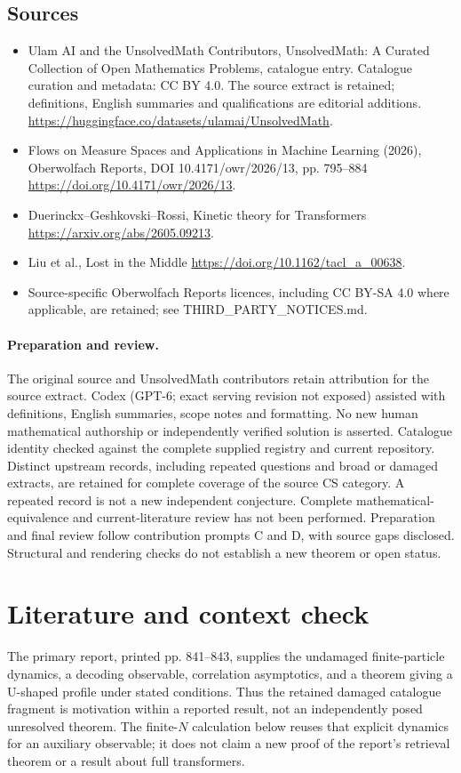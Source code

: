 \documentclass[11pt]{article}
\begin{document}
\subsection{Sources}
\begin{itemize}
\item[S1] Ulam AI and the UnsolvedMath Contributors, UnsolvedMath: A Curated Collection of Open Mathematics Problems, catalogue entry. Catalogue curation and metadata: CC BY 4.0. The source extract is retained; definitions, English summaries and qualifications are editorial additions.
\url{https://huggingface.co/datasets/ulamai/UnsolvedMath}.
\item[S2] Flows on Measure Spaces and Applications in Machine Learning (2026), Oberwolfach Reports, DOI 10.4171/owr/2026/13, pp. 795--884
\url{https://doi.org/10.4171/owr/2026/13}.
\item[S3] Duerinckx--Geshkovski--Rossi, Kinetic theory for Transformers
\url{https://arxiv.org/abs/2605.09213}.
\item[S4] Liu et al., Lost in the Middle
\url{https://doi.org/10.1162/tacl_a_00638}.
\item Source-specific Oberwolfach Reports licences, including CC BY-SA 4.0 where applicable, are retained; see THIRD\_PARTY\_NOTICES.md.
\end{itemize}
\paragraph{Preparation and review.}
The original source and UnsolvedMath contributors retain attribution for the source extract. Codex (GPT-6; exact serving revision not exposed) assisted with definitions, English summaries, scope notes and formatting. No new human mathematical authorship or independently verified solution is asserted. Catalogue identity checked against the complete supplied registry and current repository. Distinct upstream records, including repeated questions and broad or damaged extracts, are retained for complete coverage of the source CS category. A repeated record is not a new independent conjecture. Complete mathematical-equivalence and current-literature review has not been performed. Preparation and final review follow contribution prompts C and D, with source gaps disclosed. Structural and rendering checks do not establish a new theorem or open status.
\label{end:statement}

\section{Literature and context check}
The primary report, printed pp. 841--843, supplies the undamaged finite-particle dynamics, a decoding observable, correlation asymptotics, and a theorem giving a U-shaped profile under stated conditions. Thus the retained damaged catalogue fragment is motivation within a reported result, not an independently posed unresolved theorem. The finite-$N$ calculation below reuses that explicit dynamics for an auxiliary observable; it does not claim a new proof of the report's retrieval theorem or a result about full transformers.
\end{document}
